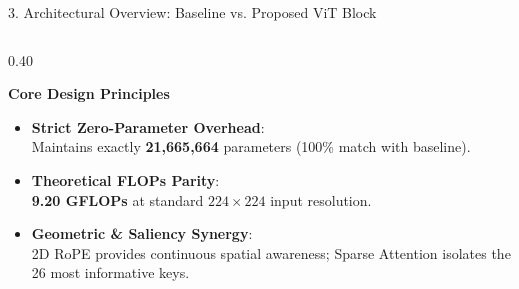 \documentclass[aspectratio=169,10pt]{beamer}
\begin{document}
\begin{frame}{3. Architectural Overview: Baseline vs. Proposed ViT Block}
\begin{columns}[c]
    \begin{column}{0.40\textwidth}
        \begin{block}{\textbf{Core Design Principles}}
            \small
            \begin{itemize}\setlength{\itemsep}{5pt}
                \item \textbf{Strict Zero-Parameter Overhead}:\\
                Maintains exactly \textbf{21,665,664} parameters (100\% match with baseline).
                \item \textbf{Theoretical FLOPs Parity}:\\
                \textbf{9.20 GFLOPs} at standard $224\times 224$ input resolution.
                \item \textbf{Geometric \& Saliency Synergy}:\\
                2D RoPE provides continuous spatial awareness; Sparse Attention isolates the 26 most informative keys.
            \end{itemize}
        \end{block}
    \end{column}
\end{columns}
\end{frame}
\end{document}

